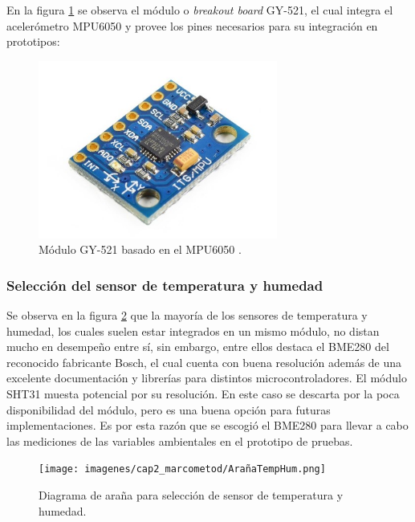 En la figura \ref{fig:mpu6050} se observa el módulo o \textit{breakout board} GY-521, el cual integra el acelerómetro MPU6050 y provee los pines necesarios para su integración en prototipos:

\begin{figure}[H]
    \centering
    \includegraphics[width = 0.7\textwidth]{imagenes/cap2_marcometod/MPU6050BREAKOUT.jpg}
    \caption{Módulo GY-521 basado en el MPU6050 \citep{mpu6050}.}
    \label{fig:mpu6050}
\end{figure}


\subsubsection{Selección del sensor de temperatura y humedad}

Se observa en la figura \ref{fig:arañatemphum} que la mayoría de los sensores de temperatura y humedad, los cuales suelen estar integrados en un mismo módulo, no distan mucho en desempeño entre sí, sin embargo, entre ellos destaca el BME280 del reconocido fabricante Bosch, el cual cuenta con buena resolución además de una excelente documentación y librerías para distintos microcontroladores. El módulo SHT31 muesta potencial por su resolución. En este caso se descarta por la poca disponibilidad del módulo, pero es una buena opción para futuras implementaciones. Es por esta razón que se escogió el BME280 para llevar a cabo las mediciones de las variables ambientales en el prototipo de pruebas.

\begin{figure}[H]
    \centering
    \texttt{[image: imagenes/cap2\_marcometod/ArañaTempHum.png]}
    \caption{Diagrama de araña para selección de sensor de temperatura y humedad.}
    \label{fig:arañatemphum}
\end{figure}

